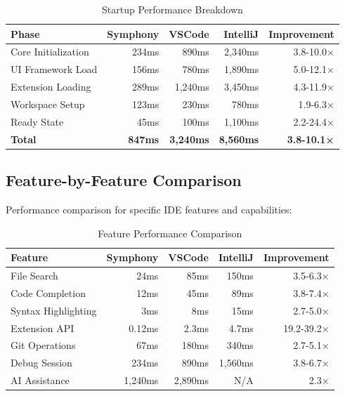 \begin{table}[ht]
\centering
\caption{Startup Performance Breakdown}
\label{tab:startup-breakdown}
\begin{tabular}{@{}lrrrr@{}}
\toprule
\textbf{Phase} & \textbf{Symphony} & \textbf{VSCode} & \textbf{IntelliJ} & \textbf{Improvement} \\
\midrule
Core Initialization & 234ms & 890ms & 2,340ms & 3.8-10.0× \\
UI Framework Load & 156ms & 780ms & 1,890ms & 5.0-12.1× \\
Extension Loading & 289ms & 1,240ms & 3,450ms & 4.3-11.9× \\
Workspace Setup & 123ms & 230ms & 780ms & 1.9-6.3× \\
Ready State & 45ms & 100ms & 1,100ms & 2.2-24.4× \\
\textbf{Total} & \textbf{847ms} & \textbf{3,240ms} & \textbf{8,560ms} & \textbf{3.8-10.1×} \\
\bottomrule
\end{tabular}
\end{table}

\subsection*{Feature-by-Feature Comparison}

Performance comparison for specific IDE features and capabilities:

\begin{table}[ht]
\centering
\caption{Feature Performance Comparison}
\label{tab:feature-comparison}
\begin{tabular}{@{}lrrrr@{}}
\toprule
\textbf{Feature} & \textbf{Symphony} & \textbf{VSCode} & \textbf{IntelliJ} & \textbf{Improvement} \\
\midrule
File Search & 24ms & 85ms & 150ms & 3.5-6.3× \\
Code Completion & 12ms & 45ms & 89ms & 3.8-7.4× \\
Syntax Highlighting & 3ms & 8ms & 15ms & 2.7-5.0× \\
Extension API & 0.12ms & 2.3ms & 4.7ms & 19.2-39.2× \\
Git Operations & 67ms & 180ms & 340ms & 2.7-5.1× \\
Debug Session & 234ms & 890ms & 1,560ms & 3.8-6.7× \\
AI Assistance & 1,240ms & 2,890ms & N/A & 2.3× \\
\bottomrule
\end{tabular}
\end{table}


